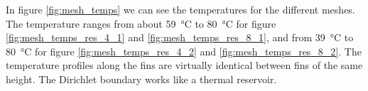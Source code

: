 In figure \ref{fig:mesh_temps} we can see the temperatures for the different meshes. The temperature ranges from about \SI{59}{\celsius} to \SI{80}{\celsius} for figure \ref{fig:mesh_temps_res_4_1} and \ref{fig:mesh_temps_res_8_1}, and from \SI{39}{\celsius} to \SI{80}{\celsius} for figure \ref{fig:mesh_temps_res_4_2} and \ref{fig:mesh_temps_res_8_2}. The temperature profiles along the fins are virtually identical between fins of the same height. The Dirichlet boundary works like a thermal reservoir.